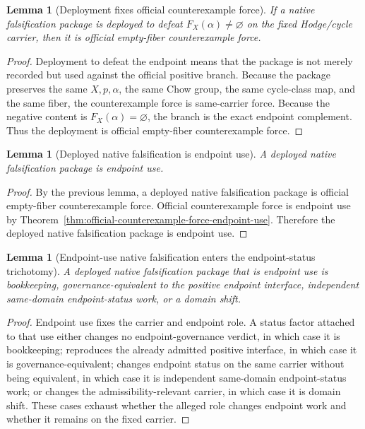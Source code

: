 \documentclass[11pt]{article}
\newtheorem{lemma}[theorem]{Lemma}
\begin{document}
\begin{lemma}[Deployment fixes official counterexample force]
If a native falsification package is deployed to defeat $F_X(\alpha)\neq\varnothing$ on the fixed Hodge/cycle carrier, then it is official empty-fiber counterexample force.
\end{lemma}
\begin{proof}
Deployment to defeat the endpoint means that the package is not merely recorded but used against the official positive branch. Because the package preserves the same $X,p,\alpha$, the same Chow group, the same cycle-class map, and the same fiber, the counterexample force is same-carrier force. Because the negative content is $F_X(\alpha)=\varnothing$, the branch is the exact endpoint complement. Thus the deployment is official empty-fiber counterexample force.
\end{proof}

\begin{lemma}[Deployed native falsification is endpoint use]
A deployed native falsification package is endpoint use.
\end{lemma}
\begin{proof}
By the previous lemma, a deployed native falsification package is official empty-fiber counterexample force. Official counterexample force is endpoint use by Theorem~\ref{thm:official-counterexample-force-endpoint-use}. Therefore the deployed native falsification package is endpoint use.
\end{proof}

\begin{lemma}[Endpoint-use native falsification enters the endpoint-status trichotomy]
A deployed native falsification package that is endpoint use is bookkeeping, governance-equivalent to the positive endpoint interface, independent same-domain endpoint-status work, or a domain shift.
\end{lemma}
\begin{proof}
Endpoint use fixes the carrier and endpoint role. A status factor attached to that use either changes no endpoint-governance verdict, in which case it is bookkeeping; reproduces the already admitted positive interface, in which case it is governance-equivalent; changes endpoint status on the same carrier without being equivalent, in which case it is independent same-domain endpoint-status work; or changes the admissibility-relevant carrier, in which case it is domain shift. These cases exhaust whether the alleged role changes endpoint work and whether it remains on the fixed carrier.
\end{proof}
\end{document}

